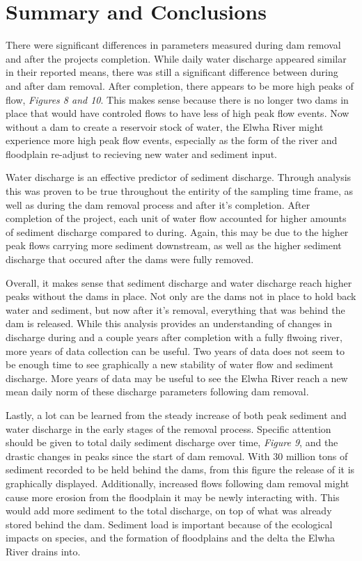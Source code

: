 \documentclass[12pt,]{article}
\begin{document}
\newpage

\hypertarget{summary-and-conclusions}{%
\section{Summary and Conclusions}\label{summary-and-conclusions}}

There were significant differences in parameters measured during dam
removal and after the projects completion. While daily water discharge
appeared similar in their reported means, there was still a significant
difference between during and after dam removal. After completion, there
appears to be more high peaks of flow, \emph{Figures 8 and 10}. This
makes sense because there is no longer two dams in place that would have
controled flows to have less of high peak flow events. Now without a dam
to create a reservoir stock of water, the Elwha River might experience
more high peak flow events, especially as the form of the river and
floodplain re-adjust to recieving new water and sediment input.

Water discharge is an effective predictor of sediment discharge. Through
analysis this was proven to be true throughout the entirity of the
sampling time frame, as well as during the dam removal process and after
it's completion. After completion of the project, each unit of water
flow accounted for higher amounts of sediment discharge compared to
during. Again, this may be due to the higher peak flows carrying more
sediment downstream, as well as the higher sediment discharge that
occured after the dams were fully removed.

Overall, it makes sense that sediment discharge and water discharge
reach higher peaks without the dams in place. Not only are the dams not
in place to hold back water and sediment, but now after it's removal,
everything that was behind the dam is released. While this analysis
provides an understanding of changes in discharge during and a couple
years after completion with a fully flwoing river, more years of data
collection can be useful. Two years of data does not seem to be enough
time to see graphically a new stability of water flow and sediment
discharge. More years of data may be useful to see the Elwha River reach
a new mean daily norm of these discharge parameters following dam
removal.

Lastly, a lot can be learned from the steady increase of both peak
sediment and water discharge in the early stages of the removal process.
Specific attention should be given to total daily sediment discharge
over time, \emph{Figure 9}, and the drastic changes in peaks since the
start of dam removal. With 30 million tons of sediment recorded to be
held behind the dams, from this figure the release of it is graphically
displayed. Additionally, increased flows following dam removal might
cause more erosion from the floodplain it may be newly interacting with.
This would add more sediment to the total discharge, on top of what was
already stored behind the dam. Sediment load is important because of the
ecological impacts on species, and the formation of floodplains and the
delta the Elwha River drains into.
\end{document}
